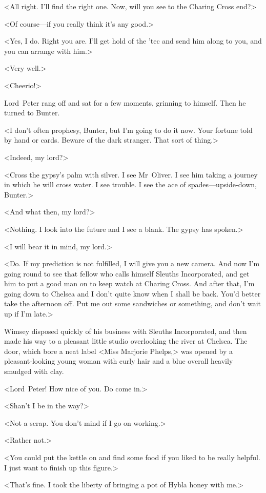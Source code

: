 <All right. I'll find the right one. Now, will you see to the Charing Cross end?>

<Of course—if you really think it's any good.>

<Yes, I do. Right you are. I'll get hold of the 'tec and send him along to you, and you can arrange with him.>

<Very well.>

<Cheerio!>

Lord~Peter rang off and sat for a few moments, grinning to himself. Then he turned to Bunter.

<I don't often prophesy, Bunter, but I'm going to do it now. Your fortune told by hand or cards. Beware of the dark stranger. That sort of thing.>

<Indeed, my lord?>

<Cross the gypsy's palm with silver. I see Mr~Oliver. I see him taking a journey in which he will cross water. I see trouble. I see the ace of spades—upside-down, Bunter.>

<And what then, my lord?>

<Nothing. I look into the future and I see a blank. The gypsy has spoken.>

<I will bear it in mind, my lord.>

<Do. If my prediction is not fulfilled, I will give you a new camera. And now I'm going round to see that fellow who calls himself Sleuths Incorporated, and get him to put a good man on to keep watch at Charing Cross. And after that, I'm going down to Chelsea and I don't quite know when I shall be back. You'd better take the afternoon off. Put me out some sandwiches or something, and don't wait up if I'm late.>

Wimsey disposed quickly of his business with Sleuths Incorporated, and then made his way to a pleasant little studio overlooking the river at Chelsea. The door, which bore a neat label <Miss Marjorie Phelps,> was opened by a pleasant-looking young woman with curly hair and a blue overall heavily smudged with clay.

<Lord~Peter! How nice of you. Do come in.>

<Shan't I be in the way?>

<Not a scrap. You don't mind if I go on working.>

<Rather not.>

<You could put the kettle on and find some food if you liked to be really helpful. I just want to finish up this figure.>

<That's fine. I took the liberty of bringing a pot of Hybla honey with me.>

